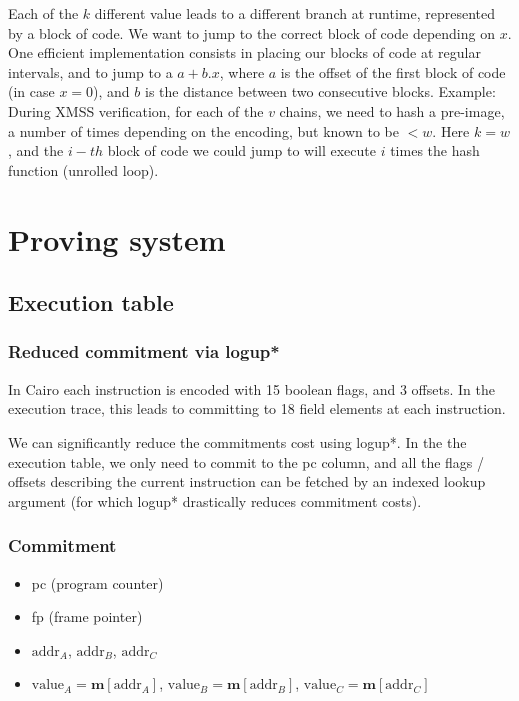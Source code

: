 \documentclass{article}
\theoremstyle{definition}
\begin{document}
Each of the $k$ different value leads to a different branch at runtime, represented by a block of code. We want to jump to the correct block of code depending on $x$.
One efficient implementation consists in placing our blocks of code at regular intervals, and to jump to a $a+ b.x$, where $a$ is the offset of the first block of code (in case $x = 0$), and $b$ is the distance between two consecutive blocks.
\newline
\newline
Example: During XMSS verification, for each of the $v$ chains, we need to hash a pre-image, a number of times depending on the encoding, but known to be $< w$. Here $k = w$, and the $i-th$ block of code we could jump to will execute $i$ times the hash function (unrolled loop).

\section{Proving system}

\subsection{Execution table}

\subsubsection{Reduced commitment via logup*}

In Cairo each instruction is encoded with 15 boolean flags, and 3 offsets. In the execution trace, this leads to committing to 18 field elements at each instruction.

We can significantly reduce the commitments cost using logup*\cite{logup_star}. In the the execution table, we only need to commit to the pc column, and all the flags / offsets describing the current instruction can be fetched by an indexed lookup argument (for which logup* drastically reduces commitment costs).

\subsubsection{Commitment}


\begin{itemize}
    \item pc (program counter)
    \item fp (frame pointer)
    \item $\text{addr}_A$, $\text{addr}_B$, $\text{addr}_C$
    \item $\text{value}_A = \textbf{m}[\text{addr}_A]$, $\text{value}_B = \textbf{m}[\text{addr}_B]$, $\text{value}_C = \textbf{m}[\text{addr}_C]$
\end{itemize}
\end{document}
